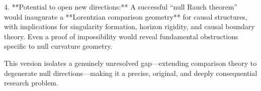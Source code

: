 4. **Potential to open new directions:**  A successful “null Rauch theorem” would inaugurate a **Lorentzian comparison geometry** for causal structures, with implications for singularity formation, horizon rigidity, and causal boundary theory.  Even a proof of impossibility would reveal fundamental obstructions specific to null curvature geometry.  

This version isolates a genuinely unresolved gap—extending comparison theory to degenerate null directions—making it a precise, original, and deeply consequential research problem.